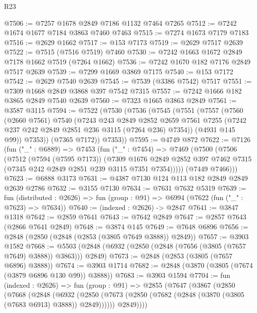 \begin{lexlean}{R23}
\begin{coremodule}
@7506 := @7257 @1678 @2849 @7186 @1132 @7464 @7265
@7512 := @7242 @1674 @1677 @7184 @3863 @7460 @7463
@7515 := @7274 @1673 @7179 @7183
@7516 := @2629 @1662
@7517 := @153 @7173
@7519 := @2629 @7517 @2639
@7522 := @7515 (@7516 @7519) @7460
@7530 := @7242 @1663 @1672 @2849 @7178 @1662 @7519 (@7264 @1662)
@7536 := @7242 @1670 @182 @7176 @2849 @7517 @2639
@7539 := @7299 @1669 @3869 @7175
@7540 := @153 @7172
@7542 := @2629 @7540 @2639
@7545 := @7539 (@3386 @7542) @7517
@7551 := @7309 @1668 @2849 @3868 @397 @7542 @7315
@7557 := @7242 @1666 @182 @3865 @2849 @7540 @2639
@7560 := @7323 @1665 @3863 @2849
@7561 := @3587 @3115
@7594 := @7522
    (@7530
      (@7536
        (@7545
          (@7551
            (@7557
              (@7560
                (@2660 @7561)
                @7540
                (@7243
                  @243
                  @2849
                  @2852
                  @2659
                  @7561
                  @7255
                  (@7242 @237 @242 @2849 @2851 @236 @3115 (@7264 @236) @7354))
                (@4931 @145 @99))
              @7353))
          (@7365 @7172))
        @7353))
@7595 := @4749 @872
@7622 := @7126
    (fun ("_" : @6889) =>
    @7453
      (fun ("_" : @7454) =>
      @7469
        (@7500
          (@7506
            (@7512
              (@7594 (@7595 @7173))
              (@7309
                @1676
                @2849
                @2852
                @397
                @7462
                @7315
                (@7345 @242 @2849 @2851 @239 @3115 @7351 @7354)))))
        (@7449 @7466)))
@7623 := @6888 @3173
@7631 := @4387 @7130 @124 @113 @182 @2849 @2849 @2639 @2786
@7632 := @3155 @7130
@7634 := @7631 @7632 @5319
@7639 := fun (distributed : @2626) =>
  fun (group : @91) => @6994 (@7622 (fun ("_" : @7623) => @7634))
@7640 := (indexed : @2626) -> @2847
@7641 := @3847 @1318
@7642 := @2859 @7641
@7643 := @7642 @2849
@7647 := @2857 @7643 (@2866 @7641 @2849)
@7648 := @3874 @145
@7649 := @7648 @6896
@7656 := @2848 (@2850 (@2848 (@2853 (@3805 @7649 @3888)) @2849))
@7657 := @3903 @1582
@7668 := @5503 (@2848 (@6932 (@2850 (@2848 (@7656 (@3805 (@7657 @7649) @3888)) @3863))) @2849)
@7673 := @2848 (@2853 (@3805 (@7657 @6896) @3888))
@7674 := @3903 @1714
@7682 := @2848 (@3870 (@3805 (@7674 (@3879 @6896 @130 @99)) @3888))
@7683 := @3903 @1594
@7704 := fun (indexed : @2626) =>
  fun (group : @91) =>
  @2855
    (@7647
      (@3867
        (@2850
          (@7668
            (@2848
              (@6932
                (@2850 (@7673 (@2850 (@7682 (@2848 (@3870 (@3805 (@7683 @6913) @3888)) @2849))))))
              @2849))))

\end{coremodule}
\end{lexlean}
